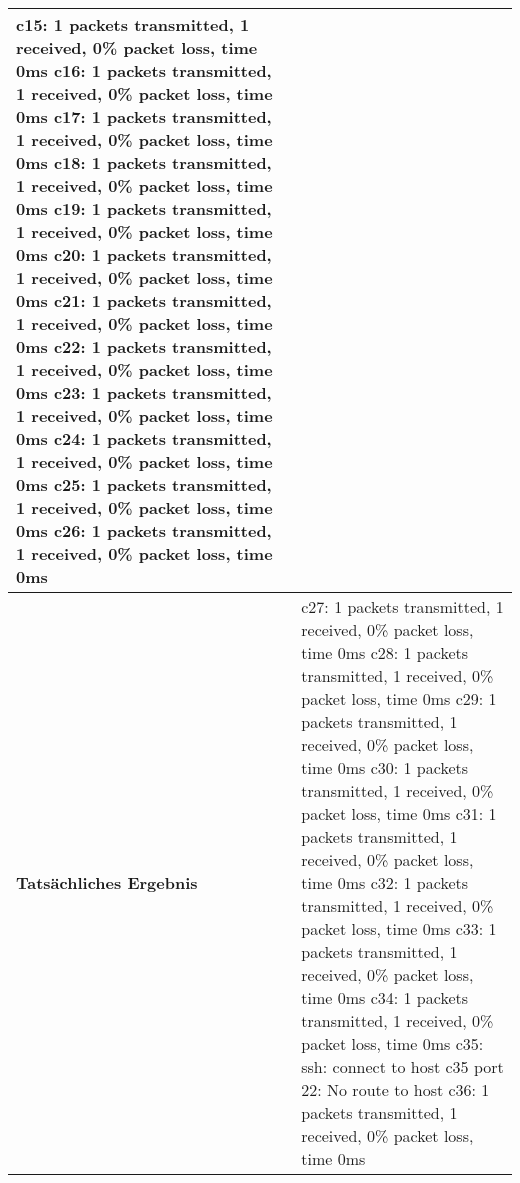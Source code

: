 \begin{longtable}{p{4.5cm}p{11.5cm}}
c15: 1 packets transmitted, 1 received, 0\% packet loss, time 0ms \newline
c16: 1 packets transmitted, 1 received, 0\% packet loss, time 0ms \newline
c17: 1 packets transmitted, 1 received, 0\% packet loss, time 0ms \newline 
c18: 1 packets transmitted, 1 received, 0\% packet loss, time 0ms \newline
c19: 1 packets transmitted, 1 received, 0\% packet loss, time 0ms \newline
c20: 1 packets transmitted, 1 received, 0\% packet loss, time 0ms \newline
c21: 1 packets transmitted, 1 received, 0\% packet loss, time 0ms \newline
c22: 1 packets transmitted, 1 received, 0\% packet loss, time 0ms \newline
c23: 1 packets transmitted, 1 received, 0\% packet loss, time 0ms \newline
c24: 1 packets transmitted, 1 received, 0\% packet loss, time 0ms \newline 
c25: 1 packets transmitted, 1 received, 0\% packet loss, time 0ms \newline
c26: 1 packets transmitted, 1 received, 0\% packet loss, time 0ms \newline
\\\hline
\cellcolor{heading}\textbf{Tatsächliches Ergebnis} & 
c27: 1 packets transmitted, 1 received, 0\% packet loss, time 0ms \newline
c28: 1 packets transmitted, 1 received, 0\% packet loss, time 0ms \newline
c29: 1 packets transmitted, 1 received, 0\% packet loss, time 0ms \newline
c30: 1 packets transmitted, 1 received, 0\% packet loss, time 0ms \newline
c31: 1 packets transmitted, 1 received, 0\% packet loss, time 0ms \newline
c32: 1 packets transmitted, 1 received, 0\% packet loss, time 0ms \newline
c33: 1 packets transmitted, 1 received, 0\% packet loss, time 0ms \newline
c34: 1 packets transmitted, 1 received, 0\% packet loss, time 0ms \newline
c35: ssh: connect to host c35 port 22: No route to host\newline
c36: 1 packets transmitted, 1 received, 0\% packet loss, time 0ms \newline

\end{longtable}
